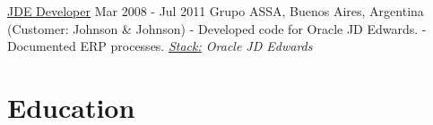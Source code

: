 \documentclass[
	a4paper,
	showframes,
]{ThirtyNinesecondscv}
\begin{document}
{\large\underline{JDE Developer}}  \hspace*{22pt} Mar 2008 - Jul 2011
\newline\newline
Grupo ASSA, Buenos Aires, Argentina (Customer: Johnson \& Johnson)
\newline- Developed code for Oracle JD Edwards.
\newline- Documented ERP processes.
\newline\textit{\underline{Stack:} Oracle JD Edwards}


\section{Education}

\begin{twenty} %
\end{twenty}

 \begin{twenty}
 \end{twenty}
\end{document}
